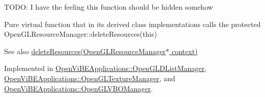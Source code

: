 \label{classOpenViBEApplications_1_1OpenGLResourceManager_af077b20ea2602b4de7981113ee8dd007}
TODO: I have the feeling this function should be hidden somehow\par
 Pure virtual function that in its derived class implementations calls the protected OpenGLResourceManager::deleteResources(this) \begin{DoxySeeAlso}{See also}
\hyperlink{classOpenViBEApplications_1_1OpenGLResourceManager_a2a67ee37ee11a899421d76b4db922047}{deleteResources(OpenGLResourceManager$\ast$ context)} 
\end{DoxySeeAlso}


Implemented in \hyperlink{classOpenViBEApplications_1_1OpenGLDListManager_aef0cc35e86caae475ef6c76ae7e83930}{OpenViBEApplications::OpenGLDListManager}, \hyperlink{classOpenViBEApplications_1_1OpenGLTextureManager_a6d6008cb4bce50fc65dc9cfe9d72265b}{OpenViBEApplications::OpenGLTextureManager}, and \hyperlink{classOpenViBEApplications_1_1OpenGLVBOManager_adc61b3455ba60ee1f57b8dc2117514ed}{OpenViBEApplications::OpenGLVBOManager}.

